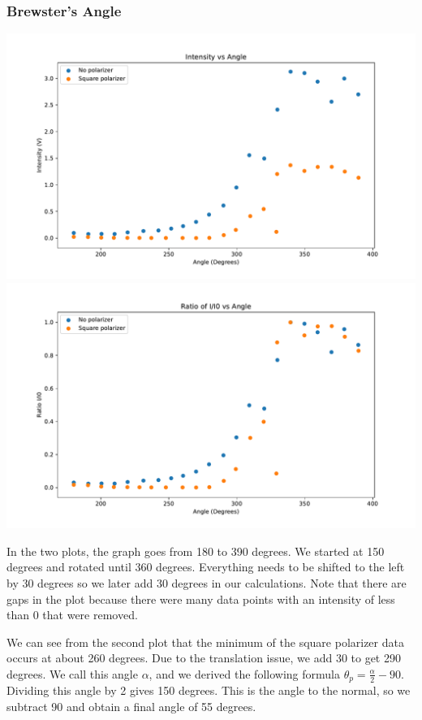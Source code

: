 \documentclass[a4paper, 11pt]{article}
\begin{document}
\subsubsection*{Brewster's Angle}
\includegraphics[width=\textwidth]{brewster-plot.pdf}
\includegraphics[width=\textwidth]{brewster-ratio.pdf}

In the two plots, the graph goes from 180 to 390 degrees. We started at 150 degrees and rotated until 360 degrees. Everything needs to be shifted to the left by 30 degrees so we later add 30 degrees in our calculations. Note that there are gaps in the plot because there were many data points with an intensity of less than 0 that were removed.

We can see from the second plot that the minimum of the square polarizer data occurs at about 260 degrees. Due to the translation issue, we add 30 to get 290 degrees. We call this angle $\alpha$, and we derived the following formula $\theta_p = \frac{\alpha}{2} - 90$. Dividing this angle by 2 gives 150 degrees. This is the angle to the normal, so we subtract 90 and obtain a final angle of 55 degrees.
\end{document}
